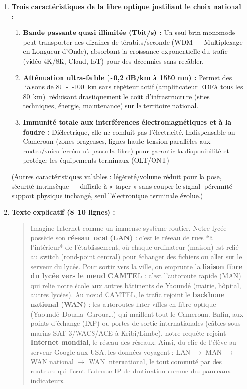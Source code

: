 \documentclass[11pt]{article}
\begin{document}
\begin{corrige}
\begin{enumerate}
  \item \textbf{Trois caractéristiques de la fibre optique justifiant le choix national :}
  \begin{enumerate}
    \item \textbf{Bande passante quasi illimitée (Tbit/s) :} Un seul brin monomode peut transporter des dizaines de térabits/seconde (WDM — Multiplexage en Longueur d'Onde), absorbant la croissance exponentielle du trafic (vidéo 4K/8K, Cloud, IoT) pour des décennies sans recâbler.
    \item \textbf{Atténuation ultra-faible (\textasciitilde 0,2 dB/km à 1550 nm) :} Permet des liaisons de \SI{80}{--}\SI{100}{km} sans répéteur actif (amplificateur EDFA tous les \SI{80}{km}), réduisant drastiquement le coût d'infrastructure (sites techniques, énergie, maintenance) sur le territoire national.
    \item \textbf{Immunité totale aux interférences électromagnétiques et à la foudre :} Diélectrique, elle ne conduit pas l'électricité. Indispensable au Cameroun (zones orageuses, lignes haute tension parallèles aux routes/voies ferrées où passe la fibre) pour garantir la disponibilité et protéger les équipements terminaux (OLT/ONT).
  \end{enumerate}
  (Autres caractéristiques valables : légèreté/volume réduit pour la pose, sécurité intrinsèque — difficile à « taper » sans couper le signal, pérennité — support physique inchangé, seul l'électronique terminale évolue.)
  
  \item \textbf{Texte explicatif (8--10 lignes) :}
  \begin{quote}
  \small
  Imagine Internet comme un immense système routier. Notre lycée possède son \textbf{réseau local (LAN)} : c'est le réseau de rues *à l'intérieur* de l'établissement, où chaque ordinateur (maison) est relié au switch (rond-point central) pour échanger des fichiers ou aller sur le serveur du lycée. Pour sortir vers la ville, on emprunte la \textbf{liaison fibre du lycée vers le nœud CAMTEL} : c'est l'autoroute rapide (MAN) qui relie notre école aux autres bâtiments de Yaoundé (mairie, hôpital, autres lycées). Au nœud CAMTEL, le trafic rejoint le \textbf{backbone national (WAN)} : les autoroutes inter-villes en fibre optique (Yaoundé–Douala–Garoua…) qui maillent tout le Cameroun. Enfin, aux points d'échange (IXP) ou portes de sortie internationales (câbles sous-marins SAT-3/WACS/ACE à Kribi/Limbe), notre requête rejoint \textbf{Internet mondial}, le réseau des réseaux. Ainsi, du clic de l'élève au serveur Google aux USA, les données voyagent : LAN $\rightarrow$ MAN $\rightarrow$ WAN national $\rightarrow$ WAN international, le tout commuté par des routeurs qui lisent l'adresse IP de destination comme des panneaux indicateurs.
  \end{quote}
\end{enumerate}
\end{corrige}
\end{document}
